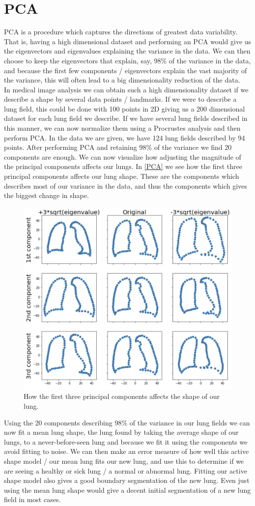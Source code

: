 \section{PCA}
PCA is a procedure which captures the directions of greatest data variability. That is, having a high dimensional dataset and performing an PCA would give us the eigenvectors and eigenvalues explaining the variance in the data. We can then choose to keep the eigenvectors that explain, say, 98\% of the variance in the data, and because the first few components / eigenvectors explain the vast majority of the variance, this will often lead to a big dimensionality reduction of the data.\\
In medical image analysis we can obtain such a high dimensionality dataset if we describe a shape by several data points / landmarks. If we were to describe a lung field, this could be done with 100 points in 2D giving us a 200 dimensional dataset for each lung field we describe. If we have several lung fields described in this manner, we can now normalize them using a Procrustes analysis and then perform PCA. In the data we are given, we have 124 lung fields described by 94 points. After performing PCA and retaining 98\% of the variance we find 20 components are enough. We can now visualize how adjusting the magnitude of the principal components affects our lungs. In \autoref{PCA} we see how the first three principal components affects our lung shape. These are the components which describes most of our variance in the data, and thus the components which gives the biggest change in shape.

\begin{figure}[h]
	\centering
	\includegraphics[width=0.73\linewidth]{Materials/PCA}
	\caption{How the first three principal components affects the shape of our lung.}
	\label{PCA}
\end{figure}
Using the 20 components describing 98\% of the variance in our lung fields we can now fit a mean lung shape, the lung found by taking the average shape of our lungs, to a never-before-seen lung and because we fit it using the components we avoid fitting to noise. We can then make an error measure of how well this active shape model / our mean lung fits our new lung, and use this to determine if we are seeing a healthy or sick lung / a normal or abnormal lung. Fitting our active shape model also gives a good boundary segmentation of the new lung. Even just using the mean lung shape would give a decent initial segmentation of a new lung field in most cases.
